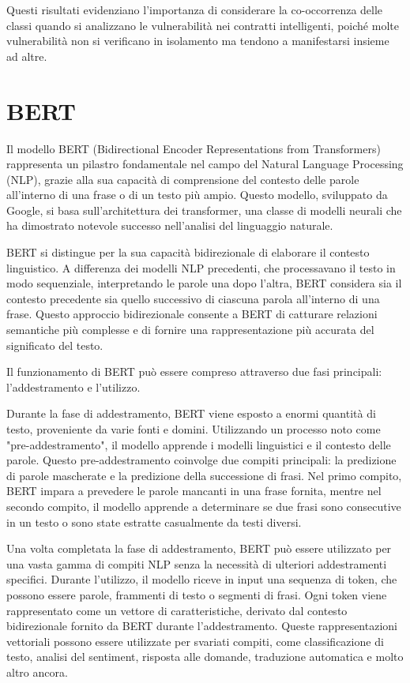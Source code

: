 \documentclass[../../Thesis.tex]{subfiles}
\begin{document}
Questi risultati evidenziano l'importanza di considerare la co-occorrenza delle classi quando si analizzano le vulnerabilità nei contratti intelligenti, poiché molte vulnerabilità non si verificano in isolamento ma tendono a manifestarsi insieme ad altre.


\section{BERT}
Il modello BERT (Bidirectional Encoder Representations from Transformers) rappresenta un pilastro fondamentale nel campo del Natural Language Processing (NLP), grazie alla sua capacità di comprensione del contesto delle parole all'interno di una frase o di un testo più ampio. Questo modello, sviluppato da Google, si basa sull'architettura dei transformer, una classe di modelli neurali che ha dimostrato notevole successo nell'analisi del linguaggio naturale.

BERT si distingue per la sua capacità bidirezionale di elaborare il contesto linguistico. A differenza dei modelli NLP precedenti, che processavano il testo in modo sequenziale, interpretando le parole una dopo l'altra, BERT considera sia il contesto precedente sia quello successivo di ciascuna parola all'interno di una frase. Questo approccio bidirezionale consente a BERT di catturare relazioni semantiche più complesse e di fornire una rappresentazione più accurata del significato del testo.

Il funzionamento di BERT può essere compreso attraverso due fasi principali: l'addestramento e l'utilizzo.

Durante la fase di addestramento, BERT viene esposto a enormi quantità di testo, proveniente da varie fonti e domini. Utilizzando un processo noto come "pre-addestramento", il modello apprende i modelli linguistici e il contesto delle parole. Questo pre-addestramento coinvolge due compiti principali: la predizione di parole mascherate e la predizione della successione di frasi. Nel primo compito, BERT impara a prevedere le parole mancanti in una frase fornita, mentre nel secondo compito, il modello apprende a determinare se due frasi sono consecutive in un testo o sono state estratte casualmente da testi diversi.

Una volta completata la fase di addestramento, BERT può essere utilizzato per una vasta gamma di compiti NLP senza la necessità di ulteriori addestramenti specifici. Durante l'utilizzo, il modello riceve in input una sequenza di token, che possono essere parole, frammenti di testo o segmenti di frasi. Ogni token viene rappresentato come un vettore di caratteristiche, derivato dal contesto bidirezionale fornito da BERT durante l'addestramento. Queste rappresentazioni vettoriali possono essere utilizzate per svariati compiti, come classificazione di testo, analisi del sentiment, risposta alle domande, traduzione automatica e molto altro ancora.
\end{document}
